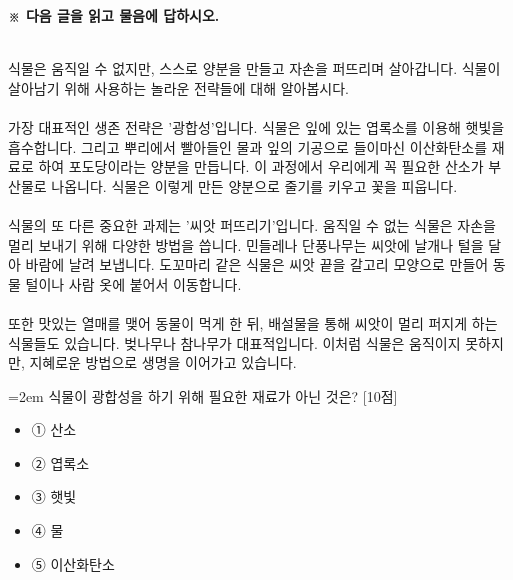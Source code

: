 \documentclass[12pt,a4paper]{article}
\newcommand{\qnum}[1]{%
  \tikz[baseline=(num.base)]{%
    \node[circle, fill=numCircle, text=white, inner sep=0pt,
          minimum size=18pt, font=\small\bfseries] (num) {#1};%
  }%
}
\newcommand{\pts}[1]{%
  \hfill\textcolor{ptsBadge}{[#1점]}%
}
\begin{document}
\vspace{4mm}
{\small\textbf{※ 다음 글을 읽고 물음에 답하시오.}}
\vspace{2mm}
\begin{tcolorbox}[passage]
[지문] \\{}
식물은 움직일 수 없지만, 스스로 양분을 만들고 자손을 퍼뜨리며 살아갑니다. 식물이 살아남기 위해 사용하는 놀라운 전략들에 대해 알아봅시다. \\{}
\vspace{4pt} \\{}
가장 대표적인 생존 전략은 '광합성'입니다. 식물은 잎에 있는 엽록소를 이용해 햇빛을 흡수합니다. 그리고 뿌리에서 빨아들인 물과 잎의 기공으로 들이마신 이산화탄소를 재료로 하여 포도당이라는 양분을 만듭니다. 이 과정에서 우리에게 꼭 필요한 산소가 부산물로 나옵니다. 식물은 이렇게 만든 양분으로 줄기를 키우고 꽃을 피웁니다. \\{}
\vspace{4pt} \\{}
식물의 또 다른 중요한 과제는 '씨앗 퍼뜨리기'입니다. 움직일 수 없는 식물은 자손을 멀리 보내기 위해 다양한 방법을 씁니다. 민들레나 단풍나무는 씨앗에 날개나 털을 달아 바람에 날려 보냅니다. 도꼬마리 같은 식물은 씨앗 끝을 갈고리 모양으로 만들어 동물 털이나 사람 옷에 붙어서 이동합니다. \\{}
\vspace{4pt} \\{}
또한 맛있는 열매를 맺어 동물이 먹게 한 뒤, 배설물을 통해 씨앗이 멀리 퍼지게 하는 식물들도 있습니다. 벚나무나 참나무가 대표적입니다. 이처럼 식물은 움직이지 못하지만, 지혜로운 방법으로 생명을 이어가고 있습니다.
\end{tcolorbox}
\vspace{3mm}
\begin{minipage}{\columnwidth}
{\hangindent=2em
\qnum{9}\enspace 식물이 광합성을 하기 위해 필요한 재료가 아닌 것은? \pts{10}
\par}

\vspace{3mm}
\begin{itemize}[leftmargin=2.5em, labelsep=0.3em, label={}, itemsep=4pt, parsep=1pt, topsep=0pt]
  \item ① 산소
  \item ② 엽록소
  \item ③ 햇빛
  \item ④ 물
  \item ⑤ 이산화탄소
\end{itemize}
\end{minipage}
\vspace{4mm}
\end{document}
